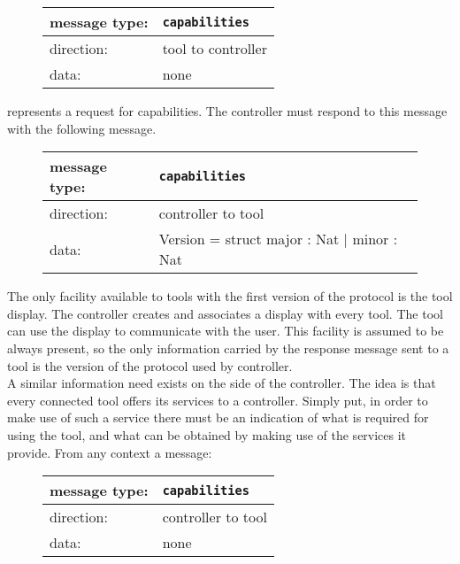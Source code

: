 \documentclass{article}
\newcommand{\msg}[1]{\texttt{#1}}
\begin{document}
   \begin{figure}[H]
    \begin{tabular}{|ll|}
     \hline
     message type:    & \msg{capabilities} \\
     \hline
     direction:       & tool to controller \\
     data:            & none \\
     \hline
    \end{tabular}
   \end{figure}

   \noindent represents a request for capabilities. The controller must respond
   to this message with the following message.

   \begin{figure}[H]
    \begin{tabular}{|ll|}
     \hline
      message type:   & \msg{capabilities} \\
     \hline
      direction:      & controller to tool \\
      data:           & Version = struct major : Nat $|$ minor : Nat \\
     \hline
    \end{tabular}
   \end{figure}

   The only facility available to tools with the first version of the protocol
   is the tool display. The controller creates and associates a display with
   every tool. The tool can use the display to communicate with the user. This
   facility is assumed to be always present, so the only information carried by
   the response message sent to a tool is the version of the protocol used by
   controller.
   \\[4pt]
   A similar information need exists on the side of the controller. The idea is
   that every connected tool offers its services to a controller.  Simply put,
   in order to make use of such a service there must be an indication of what
   is required for using the tool, and what can be obtained by making use of the
   services it provide. From any
   context a message:
   
   \begin{figure}[H]
    \begin{tabular}{|ll|}
     \hline
      message type:   & \msg{capabilities} \\
     \hline
      direction:      & controller to tool \\
      data:           & none \\
     \hline
    \end{tabular}
   \end{figure}
\end{document}
